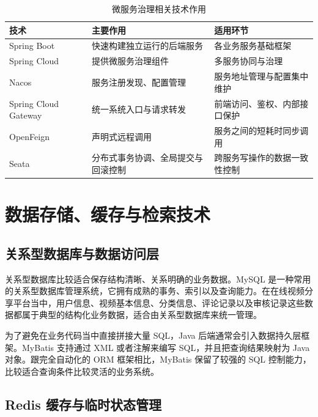 \begin{table}[htbp]
  \centering
  \caption{微服务治理相关技术作用}
  \label{tab:microservice-tech-summary}
  \begin{tabular}{p{}p{}p{}}
    \hline
    \textbf{技术} & \textbf{主要作用} & \textbf{适用环节} \\
    \hline
    Spring Boot & 快速构建独立运行的后端服务 & 各业务服务基础框架 \\
    Spring Cloud & 提供微服务治理组件 & 多服务协同与治理 \\
    Nacos & 服务注册发现、配置管理 & 服务地址管理与配置集中维护 \\
    Spring Cloud Gateway & 统一系统入口与请求转发 & 前端访问、鉴权、内部接口保护 \\
    OpenFeign & 声明式远程调用 & 服务之间的短耗时同步调用 \\
        Seata & 分布式事务协调、全局提交与回滚控制 & 跨服务写操作的数据一致性控制 \\
    \hline
  \end{tabular}
\end{table}

\section{数据存储、缓存与检索技术}
\label{sec:data-storage-cache-search}

\subsection{关系型数据库与数据访问层}
\label{subsec:mysql-mybatis}

关系型数据库比较适合保存结构清晰、关系明确的业务数据。MySQL 是一种常用的关系型数据库管理系统，它拥有成熟的事务、索引以及查询能力\cite{mysqldocs}。在在线视频分享平台当中，用户信息、视频基本信息、分类信息、评论记录以及审核记录这些数据都属于典型的结构化业务数据，适合由关系型数据库来统一管理。

为了避免在业务代码当中直接拼接大量 SQL，Java 后端通常会引入数据持久层框架。MyBatis 支持通过 XML 或者注解来编写 SQL，并且把查询结果映射为 Java 对象\cite{mybatisdocs}。跟完全自动化的 ORM 框架相比，MyBatis 保留了较强的 SQL 控制能力，比较适合查询条件比较灵活的业务系统。

\subsection{Redis 缓存与临时状态管理}
\label{subsec:redis-cache}

